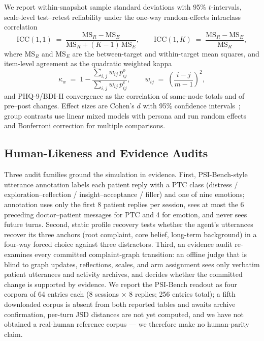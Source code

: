 \documentclass[10pt]{article}
\begin{document}
We report within-snapshot sample standard deviations with 95\% $t$-intervals, scale-level test--retest reliability under the one-way random-effects intraclass correlation~\citep{shrout1979}
\begin{equation}\label{eq:icc1}
\mathrm{ICC}(1,1) \;=\; \frac{\mathrm{MS}_R - \mathrm{MS}_E}{\mathrm{MS}_R + (K-1)\,\mathrm{MS}_E},
\qquad
\mathrm{ICC}(1,K) \;=\; \frac{\mathrm{MS}_R - \mathrm{MS}_E}{\mathrm{MS}_R},
\end{equation}
where $\mathrm{MS}_R$ and $\mathrm{MS}_E$ are the between-target and within-target mean squares, and item-level agreement as the quadratic weighted kappa~\citep{cohen1968}
\begin{equation}\label{eq:kappa}
\kappa_w \;=\; 1 - \frac{\sum_{i,j} w_{ij}\, p^{o}_{ij}}{\sum_{i,j} w_{ij}\, p^{e}_{ij}},
\qquad
w_{ij} \;=\; \left( \frac{i-j}{m-1} \right)^{2},
\end{equation}
and PHQ-9/BDI-II convergence as the correlation of same-node totals and of pre--post changes.
Effect sizes are Cohen's $d$ with 95\% confidence intervals~\citep{cohen1988}; group contrasts use linear mixed models with persona and run random effects and Bonferroni correction for multiple comparisons.

\subsection{Human-Likeness and Evidence Audits}\label{sec:humaneval}

Three audit families ground the simulation in evidence.
First, PSI-Bench-style utterance annotation labels each patient reply with a PTC class (distress / exploration--reflection / insight--acceptance / filler) and one of nine emotions; annotation uses only the first 8 patient replies per session, sees at most the 6 preceding doctor--patient messages for PTC and 4 for emotion, and never sees future turns.
Second, static profile recovery tests whether the agent's utterances recover its three anchors (root complaint, core belief, long-term background) in a four-way forced choice against three distractors.
Third, an evidence audit re-examines every committed complaint-graph transition: an offline judge that is blind to graph updates, reflections, scales, and arm assignment sees only verbatim patient utterances and activity archives, and decides whether the committed change is supported by evidence.
We report the PSI-Bench readout as four corpora of 64 entries each (8 sessions $\times$ 8 replies; 256 entries total); a fifth downloaded corpus is absent from both reported tables and awaits archive confirmation, per-turn JSD distances are not yet computed, and we have not obtained a real-human reference corpus --- we therefore make no human-parity claim.
\end{document}
